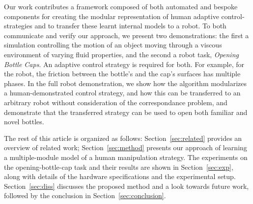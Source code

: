 Our work contributes a framework composed of both automated and
bespoke components for creating the modular representation of
human adaptive control-strategies %
and to transfer these learnt internal models to a robot. To both
communicate and verify our approach, we present two demonstrations:
the first a simulation controlling the motion of an object moving
through a viscous environment of varying fluid properties, and the
second a robot task, \emph{Opening Bottle Caps}. An adaptive control
strategy is required for both.  For example, for the robot, the
friction between the bottle's and the cap's surfaces has multiple
phases.  In the full robot demonstration, we show how the algorithm
modularizes a human-demonstrated control strategy, and how this can be
transferred to an arbitrary robot without consideration of the
correspondance problem, and demonstrate that the transferred strategy
can be used to open both familiar and novel bottles.

The rest of this article is organized as follows:
Section~\ref{sec:related} provides an overview of related work;
Section~\ref{sec:method} presents our approach of learning a
multiple-module model of a human manipulation strategy. The
experiments on the opening-bottle-cap task and their results are shown
in Section~\ref{sec:exp}, along with details of the hardware
specifications and the experimental setup. Section~\ref{sec:diss}
discusses the proposed method and a look towards future work, followed
by the conclusion in Section~\ref{sec:conclusion}.
